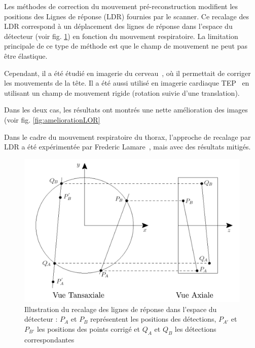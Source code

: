 Les méthodes de correction du mouvement pré-reconstruction modifient les positions des Lignes de réponse (LDR) fournies par le scanner.
Ce recalage des LDR correspond à un déplacement des lignes de réponse dans l'espace du détecteur (voir fig. \ref{fig:recalageLOR}) en fonction du mouvement respiratoire. La limitation principale de ce type de méthode est que le champ de mouvement ne peut pas être élastique.

Cependant, il a été étudié en imagerie du cerveau~\cite{bloomfield2003design}, où il permettait de corriger les mouvements de la tête. Il a été aussi utilisé en imagerie cardiaque TEP~\cite{livieratos2005rigid} en utilisant un champ de mouvement rigide (rotation suivie d'une translation).

Dans les deux cas, les résultats ont montrés une nette amélioration des images (voir fig. \ref{fig:ameliorationLOR}

Dans le cadre du mouvement respiratoire du thorax, l'approche de recalage par LDR a été expérimentée par Frederic Lamare~\cite{lamare2007respiratory}, mais avec des résultats mitigés.

\begin{figure}[h!]
	\begin{center}
		\includegraphics[width=12cm]{images/recalageLOR}
	\end{center}
	\caption{Illustration du recalage des lignes de réponse dans l'espace du détecteur : $P_A$ et $P_B$ représentent les positions des détections, $P_{A'}$ et $P_{B'}$ les positions des points corrigé et $Q_A$ et $Q_B$ les détections correspondantes } 
	\label{fig:recalageLOR}
\end{figure}


